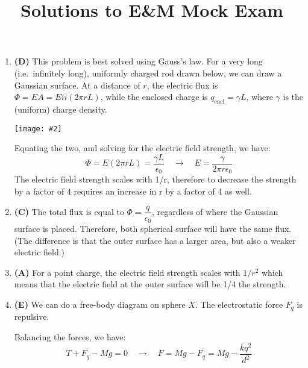 \documentclass{../oss-handout}
\title{Solutions to E\&M Mock Exam}
\newcommand{\pic}[2]{\texttt{[image: \#2]}}
\begin{document}
\thispagestyle{title}
\gentitle

\begin{enumerate}[leftmargin=17pt]
  \item\textbf{(D)} This problem is best solved using Gauss's law. For a very long (i.e.\ infinitely long),
  uniformly charged rod drawn below,  we can draw a Gaussian surface. At a distance of $r$, the
  electric flux is $\Phi=EA=Eii(2\pi rL)$, while the enclosed charge is $q_\text{encl}=\gamma L$,
  where $\gamma$ is the (uniform) charge density.
  \begin{center}
    \pic{.25}{rod1}
  \end{center}
  Equating the two, and solving for the electric field strength, we have:
  \begin{displaymath}
    \Phi = E(2\pi rL) = \frac{\gamma L}{\epsilon_0}
    \quad\rightarrow\quad E = \frac{\gamma}{2\pi r\epsilon_0}
  \end{displaymath}
  The electric field strength scales with 1/r, therefore to decrease the strength by a factor
  of 4 requires an increase in r by a factor of 4 as well.

\item\textbf{(C)} The total flux is equal to $\Phi=\dfrac q{\epsilon_0}$, regardless of where the
Gaussian surface is placed. Therefore, both spherical surface will have the same flux. (The difference
is that the outer surface has a larger area, but also a weaker electric field.)
\begin{center}
    \end{center}

\item\textbf{(A)} For a point charge, the electric field strength scales with $1/r^2$ which means that
the electric field at the outer surface will be 1/4 the strength.

\item\textbf{(E)} We can do a free-body diagram on sphere $X$. The electrostatic force $F_q$ is repulsive.
\begin{center}
\end{center}
Balancing the forces, we have:
\begin{displaymath}
  T+F_q-Mg=0 \quad\rightarrow\quad F=Mg-F_q=\boxed{Mg-\frac{kq^2}{d^2}}
\end{displaymath}
  

\end{enumerate}
\end{document}
